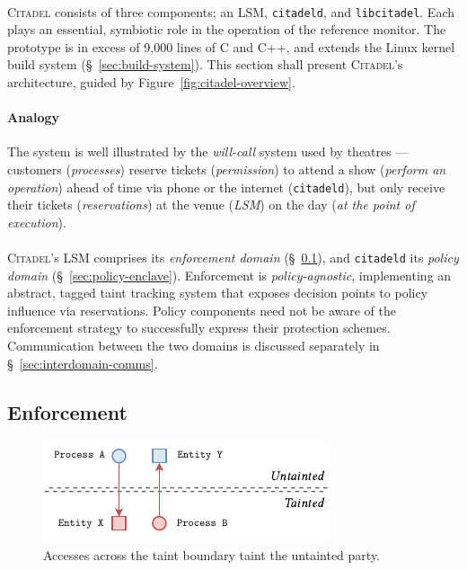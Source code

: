 \paragraph{} \textsc{Citadel} consists of three components; an LSM, \texttt{citadeld}, and \texttt{libcitadel}. Each plays an essential, symbiotic role in the operation of the reference monitor. The prototype is in excess of 9,000 lines of C and C++, and extends the Linux kernel build system (§~\ref{sec:build-system}). This section shall present \textsc{Citadel}'s architecture, guided by Figure~\ref{fig:citadel-overview}.

\paragraph{Analogy} The system is well illustrated by the \textit{will-call} system used by theatres --- customers (\textit{processes}) reserve tickets (\textit{permission}) to attend a show (\textit{perform an operation}) ahead of time via phone or the internet (\texttt{citadeld}), but only receive their tickets (\textit{reservations}) at the venue (\textit{LSM}) on the day (\textit{at the point of execution}).

\paragraph{} \textsc{Citadel}'s LSM comprises its \textit{enforcement domain} (§~\ref{sec:enforcement-domain}), and \texttt{citadeld} its \textit{policy domain} (§~\ref{sec:policy-enclave}). Enforcement is \textit{policy-agnostic}, implementing an abstract, tagged taint tracking system that exposes decision points to policy influence via reservations. Policy components need not be aware of the enforcement strategy to successfully express their protection schemes. Communication between the two domains is discussed separately in §~\ref{sec:interdomain-comms}.



\subsection{Enforcement}
\label{sec:enforcement-domain}

\begin{figure}[]
    \centering
    \includegraphics[width=0.55\linewidth]{figures/CitadelTaint.pdf}
    \caption[Accesses across the taint boundary]{Accesses across the taint boundary taint the untainted party.}
    \label{fig:taint-boundary}
\end{figure}

